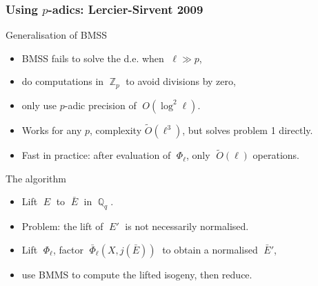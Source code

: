 \documentclass[10pt]{beamer}
\newcommand{\Z}{\mathbb{Z}}  %
\newcommand{\Q}{\mathbb{Q}}  %
\newcommand{\0}{\mathcal{O}}  %
\newcommand{\tildO}{\tilde{O}}  %
\begin{document}

\begin{frame}
  \frametitle{Using $p$-adics: Lercier-Sirvent 2009}

  \begin{block}{Generalisation of BMSS}
    \begin{itemize}
    \item BMSS fails to solve the d.e. when $\;\ell \gg p$,
    \item do computations in $\;\Z_p\;$ to avoid divisions by zero,
    \item only use $p$-adic precision of $\;O(\log^2\ell)$.
    \item Works for any $p$, complexity $\tildO(\ell^3)$, but solves
      problem 1 directly.
    \item Fast in practice: after evaluation of $\;\Phi_\ell$, only
      $\;\tildO(\ell)$ operations.
    \end{itemize}
  \end{block}

  \begin{block}{The algorithm}
    \begin{itemize}
    \item Lift $\;E\;$ to $\;\bar{E}\;$ in $\;\Q_q\;$.
    \item Problem: the lift of $\;E'\;$ is not necessarily normalised.
    \item Lift $\;\Phi_\ell$, factor $\;\bar{\Phi}_\ell(X,j(\bar{E}))\;$ to
      obtain a normalised $\;\bar{E}'$,
    \item use BMMS to compute the lifted isogeny, then reduce.
    \end{itemize}
  \end{block}
\end{frame}

\end{document}
